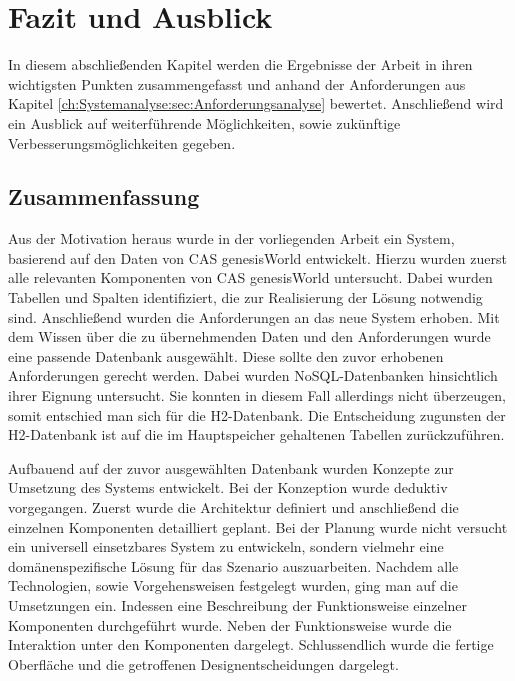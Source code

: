 
\chapter{Fazit und Ausblick}
\label{ch:Ergebnis}

In diesem abschließenden Kapitel werden die Ergebnisse der Arbeit in ihren wichtigsten Punkten zusammengefasst und anhand der Anforderungen aus Kapitel \ref{ch:Systemanalyse:sec:Anforderungsanalyse} bewertet. Anschließend wird ein Ausblick auf weiterführende Möglichkeiten, sowie zukünftige Verbesserungsmöglichkeiten gegeben. 

\section{Zusammenfassung}
\label{ch:Ergebnis:sec:zusammenfassung}

Aus der Motivation heraus wurde in der vorliegenden Arbeit ein System, basierend auf den Daten von CAS genesisWorld entwickelt. Hierzu wurden zuerst alle relevanten Komponenten von CAS genesisWorld untersucht. Dabei wurden Tabellen und Spalten identifiziert, die zur Realisierung der Lösung notwendig sind. Anschließend wurden die Anforderungen an das neue System erhoben. Mit dem Wissen über die zu übernehmenden Daten und den Anforderungen wurde eine passende Datenbank ausgewählt. Diese sollte den zuvor erhobenen Anforderungen gerecht werden. Dabei wurden NoSQL-Datenbanken hinsichtlich ihrer Eignung untersucht. Sie konnten in diesem Fall allerdings nicht überzeugen, somit entschied man sich für die H2-Datenbank. Die Entscheidung zugunsten der H2-Datenbank ist auf die im Hauptspeicher gehaltenen Tabellen zurückzuführen.   

Aufbauend auf der zuvor ausgewählten Datenbank wurden Konzepte zur Umsetzung des Systems entwickelt. Bei der Konzeption wurde deduktiv vorgegangen. Zuerst wurde die Architektur definiert und anschließend die einzelnen Komponenten detailliert geplant. Bei der Planung wurde nicht versucht ein universell einsetzbares System zu entwickeln, sondern vielmehr eine domänenspezifische Lösung für das Szenario auszuarbeiten. Nachdem alle Technologien, sowie Vorgehensweisen festgelegt wurden, ging man auf die Umsetzungen ein. Indessen eine Beschreibung der Funktionsweise einzelner Komponenten durchgeführt wurde. Neben der Funktionsweise wurde die Interaktion unter den Komponenten dargelegt. Schlussendlich wurde die fertige Oberfläche und die getroffenen Designentscheidungen dargelegt.
 
